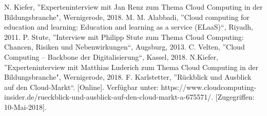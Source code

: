 \documentclass[conference]{IEEEtran}
\begin{document}
\begin{thebibliography}{00}
 N. Kiefer, ''Experteninterview mit Jan Renz zum Thema Cloud Computing in der Bildungsbranche", Wernigerode, 2018.
 M. M. Alabbadi, ''Cloud computing for education and learning: Education and learning as a service (ELaaS)“, Riyadh, 2011.
 P. Stute, ''Interview mit Philipp Stute zum Thema Cloud Computing: Chancen, Risiken und Nebenwirkungen“, Augsburg, 2013.
 C. Velten, ''Cloud Computing – Backbone der Digitalisierung“, Kassel, 2018.
 N.Kiefer, ''Experteninterview mit Matthias Luderich zum Thema Cloud Computing in der Bildungsbranche", Wernigerode, 2018.
 F. Karlstetter, ''Rückblick und Ausblick auf den Cloud-Markt“. [Online]. Verfügbar unter: https://www.cloudcomputing-insider.de/rueckblick-und-ausblick-auf-den-cloud-markt-a-675571/. [Zugegriffen: 10-Mai-2018].

\end{thebibliography}
\end{document}
